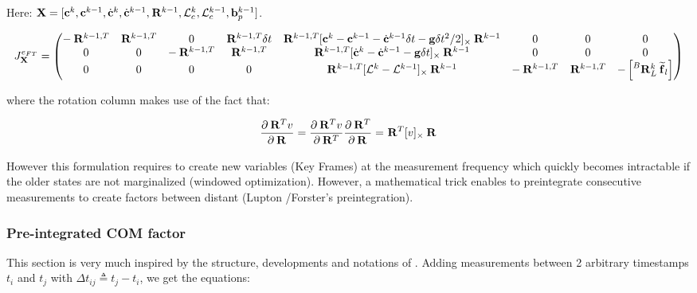 \documentclass[11pt]{article}
\newcommand{\Rot}[2]{\prescript{#1}{}{\bfR}_{#2}}
\newcommand{\bias}{\bfb}
\newcommand{\forcem}[2]{\prescript{#1}{}{\widetilde{\bff}}_{#2}}
\newcommand{\AM}{\mathcal{L}}
\newcommand{\COM}{\bfc}
\newcommand{\COMd}{\dot{\bfc}}
\begin{document}
Here: $\bfX = [\COM^k, \COM^{k-1}, \COMd^{k}, \COMd^{k-1}, \Rot{}{}^{k-1}, \AM_c^k, \AM_c^{k-1}, \bias_p^{k-1}]$.

\begin{small}
\begin{equation}
J^{e_{FT}}_{\bfX} =
\begin{pmatrix}
-\Rot{}{}^{k-1,T} & \Rot{}{}^{k-1,T} & 0 & \Rot{}{}^{k-1,T}\delta t & \Rot{}{}^{k-1,T}[\COM^k - \COM^{k-1} - \COMd^{k-1}\delta t - \bfg \delta t^2 /2]_{\times}\Rot{}{}^{k-1} & 0 & 0 & 0
\\
0 & 0 & -\Rot{}{}^{k-1,T} & \Rot{}{}^{k-1,T} & \Rot{}{}^{k-1,T}[\COMd^k - \COMd^{k-1} - \bfg \delta t]_{\times}\Rot{}{}^{k-1} & 0 & 0 & 0
\\
0 & 0 & 0 & 0 & \Rot{}{}^{k-1,T}[\AM^k - \AM^{k-1}]_{\times}\Rot{}{}^{k-1} & - \Rot{}{}^{k-1,T} & \Rot{}{}^{k-1,T} & - \left[ \Rot{B}{L}^{k} \forcem{}{l} \right]
\end{pmatrix}
\end{equation}
\end{small}

where the rotation column makes use of the fact that:

\begin{equation}
	\frac{\partial \Rot{}{}^T v}{\partial \Rot{}{}} = 
	\frac{\partial \Rot{}{}^T v}{\partial \Rot{}{}^T} \frac{\partial \Rot{}{}^T}{\partial \Rot{}{}} =
	\Rot{}{}^T [v]_{\times} \Rot{}{}
\end{equation}

However this formulation requires to create new variables (Key Frames) at the measurement frequency which quickly becomes intractable if the older states are not marginalized (windowed optimization). However, a mathematical trick enables to preintegrate consecutive measurements to create factors between distant (Lupton \cite{lupton2011visual}/Forster's \cite{forster2016manifold} preintegration).  

\subsubsection{Pre-integrated COM factor}
This section is very much inspired by the structure, developments and notations of \cite{forster2016manifold}.
Adding measurements between 2 arbitrary timestamps \(t_i\) and \(t_j\) with \(\Delta t_{ij} \triangleq t_j - t_i\), we get the equations:
\end{document}
